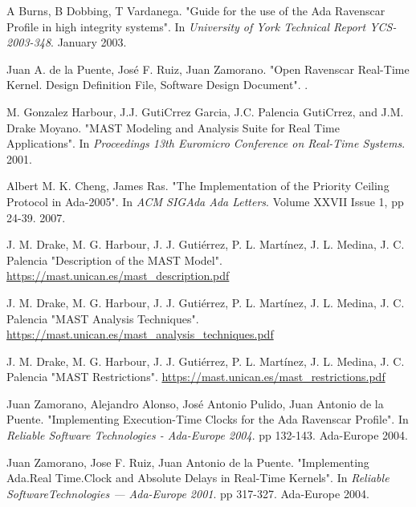 \documentclass{article}
\begin{document}
\begin{thebibliography}{1}

A Burns, B Dobbing, T Vardanega.
\newblock "Guide for the use of the Ada Ravenscar Profile in high integrity systems".
\newblock In {\em University of York Technical Report YCS-2003-348}. January 2003.

Juan A. de la Puente, José F. Ruiz, Juan Zamorano.
\newblock "Open Ravenscar Real-Time Kernel. Design Definition File, Software Design Document".
.

M. Gonzalez Harbour, J.J. GutiCrrez Garcia, J.C. Palencia GutiCrrez, and J.M. Drake Moyano.
\newblock "MAST Modeling and Analysis Suite for Real Time Applications".
\newblock In {\em Proceedings 13th Euromicro Conference on Real-Time Systems}. 2001.

Albert M. K. Cheng, James Ras.
\newblock "The Implementation of the Priority Ceiling Protocol in Ada-2005".
\newblock In {\em ACM SIGAda Ada Letters}. Volume XXVII Issue 1, pp 24-39. 2007.

J. M. Drake, M. G. Harbour, J. J. Gutiérrez, P. L. Martínez, J. L. Medina, J. C. Palencia
\newblock "Description of the MAST Model".
\newblock \url{https://mast.unican.es/mast_description.pdf}

J. M. Drake, M. G. Harbour, J. J. Gutiérrez, P. L. Martínez, J. L. Medina, J. C. Palencia
\newblock "MAST Analysis Techniques".
\newblock \url{https://mast.unican.es/mast_analysis_techniques.pdf}

J. M. Drake, M. G. Harbour, J. J. Gutiérrez, P. L. Martínez, J. L. Medina, J. C. Palencia
\newblock "MAST Restrictions".
\newblock \url{https://mast.unican.es/mast_restrictions.pdf}

Juan Zamorano, Alejandro Alonso, José Antonio Pulido, Juan Antonio de la Puente.
\newblock "Implementing Execution-Time Clocks for the Ada Ravenscar Profile".
\newblock In {\em Reliable Software Technologies - Ada-Europe 2004}. pp 132-143. Ada-Europe 2004.

Juan Zamorano, Jose F. Ruiz, Juan Antonio de la Puente.
\newblock "Implementing Ada.Real Time.Clock and Absolute Delays in Real-Time Kernels".
\newblock In {\em Reliable SoftwareTechnologies — Ada-Europe 2001}. pp 317-327. Ada-Europe 2004.


\end{thebibliography}
\end{document}
